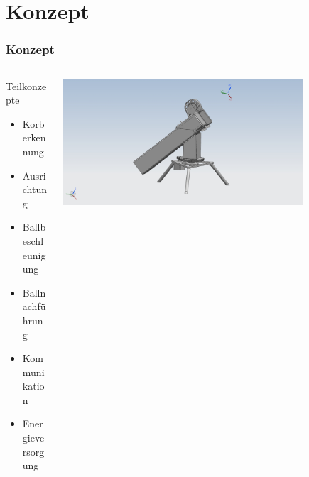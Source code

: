 \section{Konzept} %
\begin{frame}
    \frametitle{Konzept}
    \begin{columns}
        \begin{column}{0.4\textwidth}
            \begin{block}{Teilkonzepte}
                \begin{itemize}
                    \item<2-> Korberkennung
                    \item<3-> Ausrichtung
                    \item<4-> Ballbeschleunigung
                    \item<5-> Ballnachführung
                    \item<6-> Kommunikation
                    \item<7-> Energieversorgung
                \end{itemize}
            \end{block}
        \end{column}
        \begin{column}{0.6\textwidth}
            \centering
            \includegraphics[width=0.8\textwidth, trim = 150mm 50 150mm 10, clip]{../doc/fig/Gesamt_bg1.jpg}
        \end{column}
    \end{columns}
\end{frame}















